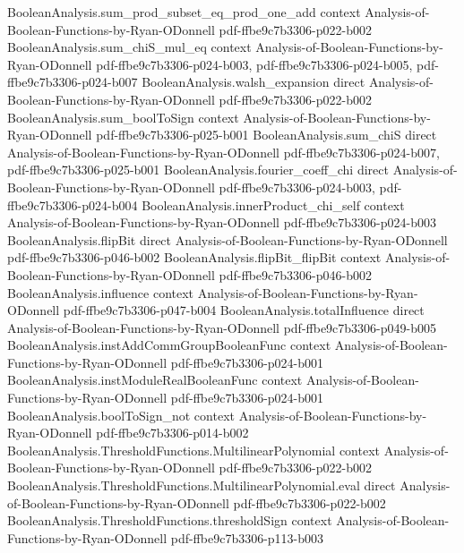 \begin{lemma}
  {BooleanAnalysis.sum_prod_subset_eq_prod_one_add}
  {context}
  {Analysis-of-Boolean-Functions-by-Ryan-ODonnell}
  {pdf-ffbe9c7b3306-p022-b002}
\proofstep
  {BooleanAnalysis.sum_chiS_mul_eq}
  {context}
  {Analysis-of-Boolean-Functions-by-Ryan-ODonnell}
  {pdf-ffbe9c7b3306-p024-b003,
    pdf-ffbe9c7b3306-p024-b005,
    pdf-ffbe9c7b3306-p024-b007}
\proofstep
  {BooleanAnalysis.walsh_expansion}
  {direct}
  {Analysis-of-Boolean-Functions-by-Ryan-ODonnell}
  {pdf-ffbe9c7b3306-p022-b002}
\proofstep
  {BooleanAnalysis.sum_boolToSign}
  {context}
  {Analysis-of-Boolean-Functions-by-Ryan-ODonnell}
  {pdf-ffbe9c7b3306-p025-b001}
\proofstep
  {BooleanAnalysis.sum_chiS}
  {direct}
  {Analysis-of-Boolean-Functions-by-Ryan-ODonnell}
  {pdf-ffbe9c7b3306-p024-b007,
    pdf-ffbe9c7b3306-p025-b001}
\proofstep
  {BooleanAnalysis.fourier_coeff_chi}
  {direct}
  {Analysis-of-Boolean-Functions-by-Ryan-ODonnell}
  {pdf-ffbe9c7b3306-p024-b003,
    pdf-ffbe9c7b3306-p024-b004}
\proofstep
  {BooleanAnalysis.innerProduct_chi_self}
  {context}
  {Analysis-of-Boolean-Functions-by-Ryan-ODonnell}
  {pdf-ffbe9c7b3306-p024-b003}
\proofstep
  {BooleanAnalysis.flipBit}
  {direct}
  {Analysis-of-Boolean-Functions-by-Ryan-ODonnell}
  {pdf-ffbe9c7b3306-p046-b002}
\proofstep
  {BooleanAnalysis.flipBit_flipBit}
  {context}
  {Analysis-of-Boolean-Functions-by-Ryan-ODonnell}
  {pdf-ffbe9c7b3306-p046-b002}
\proofstep
  {BooleanAnalysis.influence}
  {context}
  {Analysis-of-Boolean-Functions-by-Ryan-ODonnell}
  {pdf-ffbe9c7b3306-p047-b004}
\proofstep
  {BooleanAnalysis.totalInfluence}
  {direct}
  {Analysis-of-Boolean-Functions-by-Ryan-ODonnell}
  {pdf-ffbe9c7b3306-p049-b005}
\proofstep
  {BooleanAnalysis.instAddCommGroupBooleanFunc}
  {context}
  {Analysis-of-Boolean-Functions-by-Ryan-ODonnell}
  {pdf-ffbe9c7b3306-p024-b001}
\proofstep
  {BooleanAnalysis.instModuleRealBooleanFunc}
  {context}
  {Analysis-of-Boolean-Functions-by-Ryan-ODonnell}
  {pdf-ffbe9c7b3306-p024-b001}
\proofstep
  {BooleanAnalysis.boolToSign_not}
  {context}
  {Analysis-of-Boolean-Functions-by-Ryan-ODonnell}
  {pdf-ffbe9c7b3306-p014-b002}
\proofstep
  {BooleanAnalysis.ThresholdFunctions.MultilinearPolynomial}
  {context}
  {Analysis-of-Boolean-Functions-by-Ryan-ODonnell}
  {pdf-ffbe9c7b3306-p022-b002}
\proofstep
  {BooleanAnalysis.ThresholdFunctions.MultilinearPolynomial.eval}
  {direct}
  {Analysis-of-Boolean-Functions-by-Ryan-ODonnell}
  {pdf-ffbe9c7b3306-p022-b002}
\proofstep
  {BooleanAnalysis.ThresholdFunctions.thresholdSign}
  {context}
  {Analysis-of-Boolean-Functions-by-Ryan-ODonnell}
  {pdf-ffbe9c7b3306-p113-b003}

\end{lemma}

